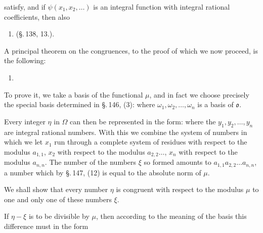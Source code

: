 satisfy, and if $\psi(x_1, x_2, \ldots)$ is an integral function with
integral rational coefficients, then also

\begin{enumerate}
\item[2.]  (\S.\,138, 13.).
\end{enumerate}

A principal theorem on the congruences, to the proof of which we
now proceed, is the following:

\begin{enumerate}
\item[3.] 
\end{enumerate}

To prove it, we take a basis of the functional $\mu$, and in fact
we choose precisely the special basis determined in \S.\,146, (3):
where $\omega_1, \omega_2, \ldots, \omega_n$ is a basis of $\mathfrak{o}$.

Every integer $\eta$ in $\Omega$ can then be represented in the
form:
where the $y_1, y_2, \ldots, y_n$ are integral rational numbers. With
this we combine the system of numbers
in which we let $x_1$ run through a complete system of residues with
respect to the modulus $a_{1,1}$, $x_2$ with respect to the modulus
$a_{2,2} \ldots$, $x_n$ with respect to the modulus $a_{n,n}$. The
number of the numbers $\xi$ so formed amounts to $a_{1,1}a_{2,2}\ldots a_{n,n}$,
a number which by \S.\,147, (12) is equal to the absolute norm
of $\mu$.

We shall show that every number $\eta$ is congruent with respect
to the modulus $\mu$ to one and only one of these numbers $\xi$.

If $\eta - \xi$ is to be divisible by $\mu$, then according to the
meaning of the basis this difference must in the form
